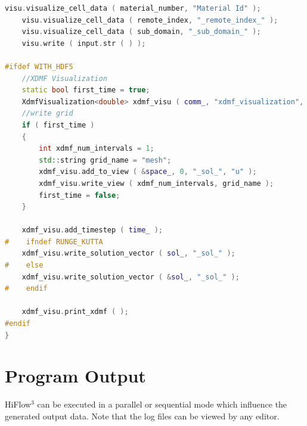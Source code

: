 \documentclass[a4paper, 11pt, twoside]{article}
\begin{document}
\begin{lstlisting}[language=C++, basicstyle={\footnotesize, \ttfamily}, keywordstyle=\color{blue}, numbers=none, tabsize=4]
    visu.visualize_cell_data ( material_number, "Material Id" );
    visu.visualize_cell_data ( remote_index, "_remote_index_" );
    visu.visualize_cell_data ( sub_domain, "_sub_domain_" );
    visu.write ( input.str ( ) );

#ifdef WITH_HDF5
    //XDMF Visualization
    static bool first_time = true;
    XdmfVisualization<double> xdmf_visu ( comm_, "xdmf_visualization", !first_time );
    //write grid
    if ( first_time )
    {
        int xdmf_num_intervals = 1;
        std::string grid_name = "mesh";
        xdmf_visu.add_to_view ( &space_, 0, "_sol_", "u" );
        xdmf_visu.write_view ( xdmf_num_intervals, grid_name );
        first_time = false;
    }

    xdmf_visu.add_timestep ( time_ );
#    ifndef RUNGE_KUTTA
    xdmf_visu.write_solution_vector ( sol_, "_sol_" );
#    else
    xdmf_visu.write_solution_vector ( &sol_, "_sol_" );
#    endif

    xdmf_visu.print_xdmf ( );
#endif
}

\end{lstlisting}

\section{Program Output}
HiFlow$^3$ can be executed in a parallel or sequential mode which influence the generated output data. Note that the log files can be viewed by any editor.
\end{document}
